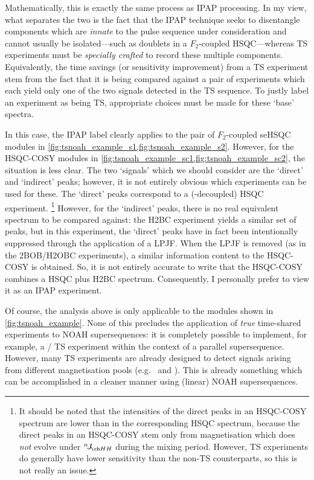 Mathematically, this is exactly the same process as IPAP processing.
In my view, what separates the two is the fact that the IPAP technique seeks to disentangle components which are \textit{innate} to the pulse sequence under consideration and cannot usually be isolated---such as doublets in a $F_2$-coupled HSQC---whereas TS experiments must be \textit{specially crafted} to record these multiple components.
Equivalently, the time savings (or sensitivity improvement) from a TS experiment stem from the fact that it is being compared against a pair of experiments which each yield only one of the two signals detected in the TS sequence.
To justly label an experiment as being TS, appropriate choices must be made for these `base' spectra.

In this case, the IPAP label clearly applies to the pair of $F_2$-coupled seHSQC modules in \cref{fig:tsnoah_example_s1,fig:tsnoah_example_s2}.
However, for the HSQC-COSY modules in \cref{fig:tsnoah_example_sc1,fig:tsnoah_example_sc2}, the situation is less clear.
The two `signals' which we should consider are the `direct' and `indirect' peaks; however, it is not entirely obvious which experiments can be used for these.
The `direct' peaks correspond to a (\carbon{}-decoupled) HSQC experiment.%
\footnote{It should be noted that the intensities of the direct peaks in an HSQC-COSY spectrum are lower than in the corresponding HSQC spectrum, because the direct peaks in an HSQC-COSY stem only from magnetisation which does \textit{not} evolve under $\nJ{HH}$ during the mixing period. However, TS experiments do generally have lower sensitivity than the non-TS counterparts, so this is not really an issue.}
However, for the `indirect' peaks, there is no real equivalent spectrum to be compared against: the H2BC experiment\autocite{Nyberg2005JACS,Nyberg2005MRC} yields a similar set of peaks, but in this experiment, the `direct' peaks have in fact been intentionally suppressed through the application of a LPJF.
When the LPJF is removed (as in the 2BOB/H2OBC experiments\autocite{Kupce2017MRC}), a similar information content to the HSQC-COSY is obtained.
So, it is not entirely accurate to write that the HSQC-COSY combines a HSQC plus H2BC spectrum.
Consequently, I personally prefer to view it as an IPAP experiment.

Of course, the analysis above is only applicable to the modules shown in \cref{fig:tsnoah_example}.
None of this precludes the application of \textit{true} time-shared experiments to NOAH supersequences: it is completely possible to implement, for example, a \carbon{}/\nitrogen{} TS experiment within the context of a parallel supersequence.
However, many TS experiments are already designed to detect signals arising from different magnetisation pools (e.g.\  and ).
This is already something which can be accomplished in a cleaner manner using (linear) NOAH supersequences.



